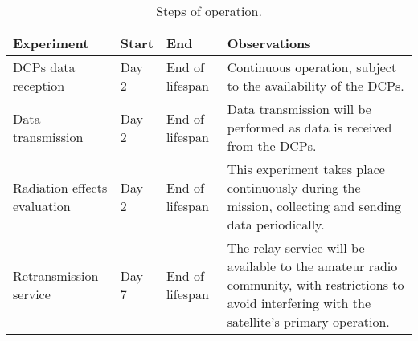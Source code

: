 \begin{table}[!htb]
    \centering
    \begin{tabular}{L{3cm}llL{7cm}}
        \toprule[1.5pt]
        \textbf{Experiment} & \textbf{Start} & \textbf{End} & \textbf{Observations} \\
        \midrule
        DCPs data reception          & Day 2 & End of lifespan & Continuous operation, subject to the availability of the DCPs. \\
        Data transmission            & Day 2 & End of lifespan & Data transmission will be performed as data is received from the DCPs. \\
        Radiation effects evaluation & Day 2 & End of lifespan & This experiment takes place continuously during the mission, collecting and sending data periodically. \\
        Retransmission service       & Day 7 & End of lifespan & The relay service will be available to the amateur radio community, with restrictions to avoid interfering with the satellite's primary operation. \\
        \bottomrule[1.5pt]
    \end{tabular}
    \caption{Steps of operation.}
    \label{tab:conops-schedule}
\end{table}
